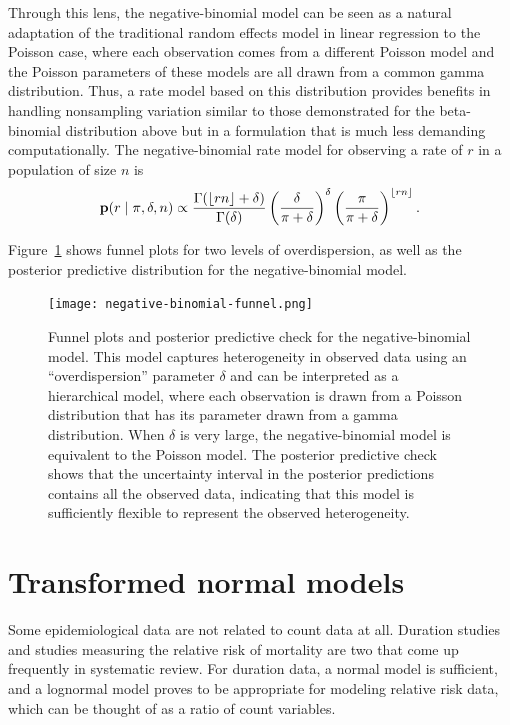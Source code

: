 Through this lens, the negative-binomial model can be seen as a
natural adaptation of the traditional random effects model in linear
regression to the Poisson case, where each observation comes from a
different Poisson model and the Poisson parameters of these models are
all drawn from a common gamma distribution. Thus, a rate model based on
this distribution provides benefits in handling nonsampling variation
similar to those demonstrated for the beta-binomial distribution
above but in a formulation that is much less demanding
computationally.  The negative-binomial rate model for observing a
rate of $r$ in a population of size $n$ is
\[
\mathbf{p}(r\;|\; \pi, \delta, n) \propto
 \frac{\Gamma(\lfloor rn \rfloor+\delta)}{\Gamma(\delta)}
 \left(\frac{\delta}{\pi+\delta}\right)^\delta \left(\frac{\pi}{\pi+\delta}\right)^{\lfloor rn\rfloor}.
\]

Figure~\ref{rate-model-negative-binomial-funnel} shows funnel plots
for two levels of overdispersion, as well as the posterior predictive
distribution for the negative-binomial model.

\begin{figure}[h!]
\begin{center}
\texttt{[image: negative-binomial-funnel.png]}
\end{center}
\caption{Funnel plots and posterior predictive check for the
  negative-binomial model. This model captures heterogeneity in
  observed data using an ``overdispersion'' parameter $\delta$ and
  can be interpreted as a hierarchical model, where each observation
  is drawn from a Poisson distribution that has its parameter drawn
  from a gamma distribution.  When $\delta$ is very large, the
  negative-binomial model is equivalent to the Poisson model.  The
  posterior predictive check shows that the uncertainty interval in the
  posterior predictions contains all the observed data, indicating
  that this model is sufficiently flexible to represent the observed
  heterogeneity.} \label{rate-model-negative-binomial-funnel}
\end{figure}

\section{Transformed normal models}
\label{transformed-normal-models}
Some epidemiological data are not related to count data at all.
Duration studies and studies measuring the relative risk of mortality
are two that come up frequently in systematic review.  For duration
data, a normal model is sufficient, and a lognormal model proves to
be appropriate for modeling relative risk data, which can be thought
of as a ratio of count variables.

